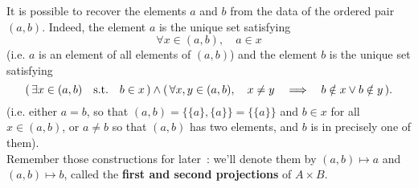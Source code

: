 \begin{remark}
	It is possible to recover the elements $a$ and $b$ from the data of the ordered pair $(a,b)$. Indeed, the element $a$ is the unique set satisfying
	\[
		\forall x \in (a,b), \quad a \in x
	\]
	(i.e. $a$ is an element of all elements of $(a,b)$) and the element $b$ is the unique set satisfying
	\[
		( \, \exists x \in (a,b) \quad \text{s.t.} \quad b \in x \, ) \wedge 
		( \, \forall x,y \in (a,b), \quad x \neq y \quad \Longrightarrow \quad b \notin x \vee b \notin y \, ).
	\]
	(i.e. either $a=b$, so that $(a,b) = \{\{a\}, \{a\}\} = \{\{a\}\}$ and $b \in x$ for all $x \in (a,b)$, or $a \neq b$ so that $(a,b)$ has two elements, and $b$ is in precisely one of them).
	\\

	Remember those constructions for later~: we'll denote them by $(a,b) \mapsto a$ and $(a,b) \mapsto b$, called the \textbf{first and second projections} of $A \times B$.
\end{remark}

